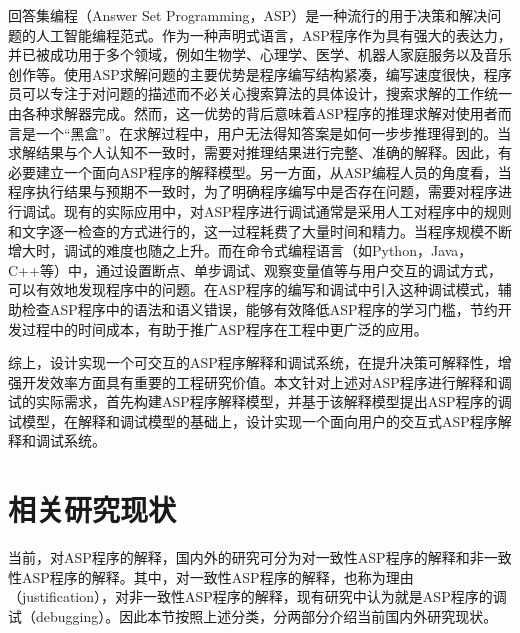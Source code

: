 回答集编程（Answer Set Programming，ASP）是一种流行的用于决策和解决问题的人工智能编程范式。作为一种声明式语言，ASP程序作为具有强大的表达力，并已被成功用于多个领域\cite{erdem2016applications}，例如生物学\cite{erdem2015generating}、心理学\cite{psychology2010Balduccini}、医学\cite{bao2011medical, zhang2014preliminary}、机器人家庭服务\cite{jjm2010robertasp}以及音乐创作\cite{boennAutomaticMusicComposition2011}等。使用ASP求解问题的主要优势是程序编写结构紧凑，编写速度很快，程序员可以专注于对问题的描述而不必关心搜索算法的具体设计，搜索求解的工作统一由各种求解器完成\cite{brain2008answer}。然而，这一优势的背后意味着ASP程序的推理求解对使用者而言是一个“黑盒”\cite{huaqi2018lp}。在求解过程中，用户无法得知答案是如何一步步推理得到的。当求解结果与个人认知不一致时，需要对推理结果进行完整、准确的解释。因此，有必要建立一个面向ASP程序的解释模型。另一方面，从ASP编程人员的角度看，当程序执行结果与预期不一致时，为了明确程序编写中是否存在问题，需要对程序进行调试。现有的实际应用中，对ASP程序进行调试通常是采用人工对程序中的规则和文字逐一检查的方式进行的，这一过程耗费了大量时间和精力\cite{dodaroInteractiveDebuggingNonground2015}。当程序规模不断增大时，调试的难度也随之上升。而在命令式编程语言（如Python，Java，C++等）中，通过设置断点、单步调试、观察变量值等与用户交互的调试方式，可以有效地发现程序中的问题\cite{stumptner1998survey}。在ASP程序的编写和调试中引入这种调试模式，辅助检查ASP程序中的语法和语义错误，能够有效降低ASP程序的学习门槛，节约开发过程中的时间成本，有助于推广ASP程序在工程中更广泛的应用。

综上，设计实现一个可交互的ASP程序解释和调试系统，在提升决策可解释性，增强开发效率方面具有重要的工程研究价值。本文针对上述对ASP程序进行解释和调试的实际需求，首先构建ASP程序解释模型，并基于该解释模型提出ASP程序的调试模型，在解释和调试模型的基础上，设计实现一个面向用户的交互式ASP程序解释和调试系统。
\section{相关研究现状}
当前，对ASP程序的解释，国内外的研究可分为对一致性ASP程序的解释和非一致性ASP程序的解释。其中，对一致性ASP程序的解释，也称为理由（justification），对非一致性ASP程序的解释，现有研究中认为就是ASP程序的调试（debugging）\cite{fandAnsWhy2019}。因此本节按照上述分类，分两部分介绍当前国内外研究现状。

